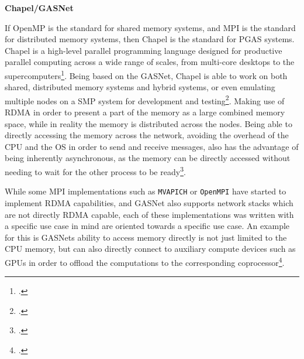

\textbf{Chapel/GASNet}
\label{sec:gasnet}

If OpenMP is the standard for shared memory systems, and \ac{MPI} is the standard for distributed memory systems, then Chapel is the standard for \ac{PGAS} systems.
Chapel is a high-level parallel programming language designed for productive parallel computing across a wide range of scales, from multi-core desktops to the supercomputers\footcite{chapel-lang.orgChapelOverview}.
Being based on the \ac{GASNet}, Chapel is able to work on both shared, distributed memory systems and hybrid systems, or even emulating multiple nodes on a \ac{SMP} system for development and testing\footcite{chapel-lang.orgMultilocaleChapelExecution}.
Making use of \ac{RDMA} in order to present a part of the memory as a large combined memory space, while in reality the memory is distributed across the nodes.
Being able to directly accessing the memory across the network, avoiding the overhead of the \ac{CPU} and the \ac{OS} in order to send and receive messages,
also has the advantage of being inherently asynchronous, as the memory can be directly accessed without needing to wait for the other process to be ready\footcite{dewanPavingWayDistributed2020}.

While some \ac{MPI} implementations such as \texttt{MVAPICH} or \texttt{OpenMPI} have started to implement \ac{RDMA} capabilities,
and \ac{GASNet} also supports network stacks which are not directly \ac{RDMA} capable,
each of these implementations was written with a specific use case in mind are oriented towards a specific use case.
An example for this is \ac{GASNet}s ability to access memory directly is not just limited to the \ac{CPU} memory,
but can also directly connect to auxiliary compute devices such as \ac{GPU}s in order to offload the
computations to the corresponding coprocessor\footcite{chamberlainPROGRAMMINGLANGUAGEPRODUCTIVE}.

